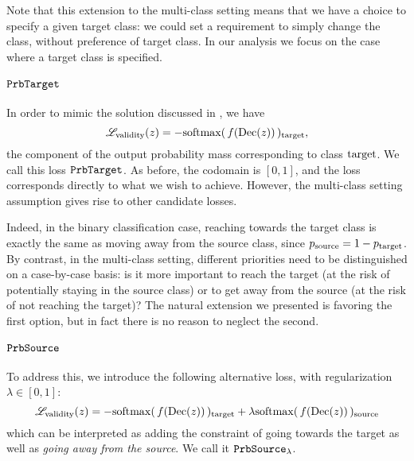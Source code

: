 \documentclass[../main.tex]{subfiles}
\begin{document}
Note that this extension to the multi-class setting means that we have a choice to specify a given target class: we could set a requirement to simply change the class, without preference of target class.
In our analysis we focus on the case where a target class is specified.


\paragraph{$\mathtt{PrbTarget}$}

In order to mimic the solution discussed in \cite{cohenGifsplanation2022}, we have
\begin{equation}
    \mathscr{L}_\text{validity}(z) = - \mathrm{softmax}(\, f(\operatorname{Dec}(z))\, )_{\mathrm{target}},
\end{equation}
\ie{} the component of the output probability mass corresponding to class $\mathrm{target}$.
We call this loss $\mathtt{PrbTarget}$.
As before, the codomain is $[0, 1]$, and the loss corresponds directly to what we wish to achieve.
However, the multi-class setting assumption gives rise to other candidate losses.

Indeed, in the binary classification case, reaching towards the target class is exactly the same as moving away from the source class, since $p_{\mathrm{source}} = 1 - p_{\mathrm{target}}$.
By contrast, in the multi-class setting, different priorities need to be distinguished on a case-by-case basis: is it more important to reach the target (at the risk of potentially staying in the source class) or to get away from the source (at the risk of not reaching the target)?
The natural extension we presented is favoring the first option, but in fact there is no reason to neglect the second.

\paragraph{$\mathtt{PrbSource}_{}$}

To address this, we introduce the following alternative loss, with regularization $\lambda \in [0, 1]$:
\begin{equation}
    \mathscr{L}_\text{validity}(z) = - \mathrm{softmax}(\, f(\operatorname{Dec}(z))\, )_{\mathrm{target}}
+ \lambda  \mathrm{softmax}(\, f(\operatorname{Dec}(z))\, )_{\mathrm{source}}
\end{equation}
which can be interpreted as adding the constraint of going towards the target as well as \emph{going away from the source}.
We call it $\mathtt{PrbSource}_{\lambda}$.
\end{document}
